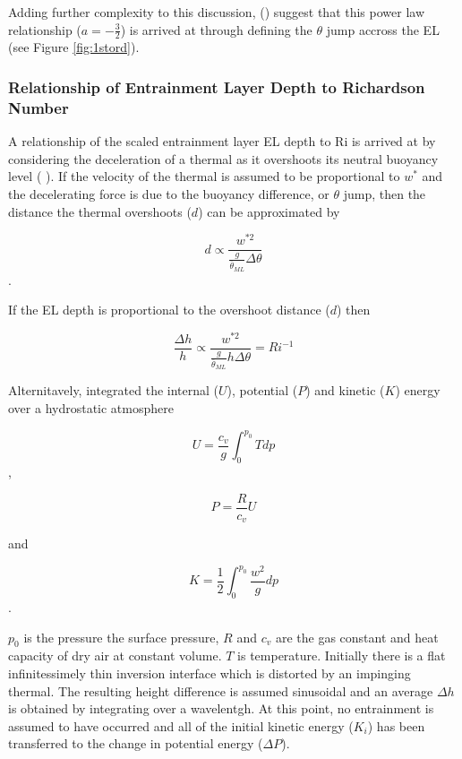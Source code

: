 Adding further complexity to this discussion, \citeauthor{FedConzMir04} (\citeyear{FedConzMir04}) suggest that this power law relationship ($a = -\frac{3}{2}$) is arrived at through defining the $\theta$ jump accross the \acs{EL} (see Figure \ref{fig:1stord}).\\

\subsubsection{Relationship of Entrainment Layer Depth to Richardson Number}

A relationship of the scaled entrainment layer \acs{EL} depth to \acs{Ri} is arrived at by considering the deceleration of a thermal
as it overshoots its neutral buoyancy level (\citeauthor{StullNelEl} \citeyear{StullNelEl}).  If the velocity of the thermal is assumed to be
proportional to $w^{*}$ and the decelerating force is due to the buoyancy difference, or $\theta$ jump, then the distance the thermal overshoots
($d$) can be approximated by

\begin{equation}
d \propto \frac{w^{*2}}{\frac{g}{\overline{\theta}_{ML}} \Delta \theta} 
\end{equation}. 

If the \acs{EL} depth is proportional to the overshoot distance ($d$) then

\begin{equation}
\frac{\Delta h}{h} \propto \frac{w^{*2}}{\frac{g}{\overline{\theta}_{ML}} h \Delta \theta} = Ri^{-1} 
\end{equation} 

Alternitavely, \citeauthor{Boers89} \citeyear{Boers89} integrated the internal ($U$), potential ($P$) and kinetic ($K$) energy over a hydrostatic atmosphere

\begin{equation}
U = \frac{c_{v}}{g}\int^{p_{0}}_{0}Tdp
\end{equation},

\begin{equation}
P = \frac{R}{c_{v}}U
\end{equation}

and

\begin{equation}
K = \frac{1}{2} \int^{p_{0}}_{0}\frac{w^{2}}{g}dp
\end{equation}.

$p_{0}$ is the pressure the surface pressure, $R$ and $c_{v}$ are the gas constant and heat capacity of dry air at constant volume.
$T$ is temperature.  Initially there is a flat infinitessimely thin inversion interface  which is distorted by an
impinging thermal.  The resulting height difference is assumed sinusoidal and an average $\Delta h$ is obtained by integrating 
over a wavelentgh.  At this point, no entrainment is assumed to have occurred and all of the initial kinetic energy ($K_{i}$) has been transferred to the change in potential energy ($\Delta P$).

